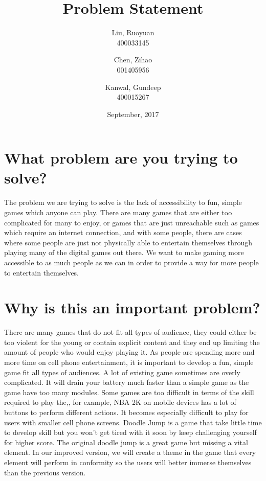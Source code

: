\documentclass[11pt, oneside]{article}
\title{Problem Statement
}
\author{Liu, Ruoyuan\\
		400033145
		\and
		Chen, Zihao\\
		001405956
		\and
		Kanwal, Gundeep\\
		400015267}
\date{September, 2017}
\begin{document}
\maketitle
\section{What problem are you trying to solve?}

\newcommand*\apos{\textsc{\char13}}
The problem we are trying to solve is the lack of accessibility to fun, simple games which anyone can play. There are many games that are either too complicated for many to enjoy, or games that are just unreachable such as games which require an internet connection, and with some people, there are cases where some people are just not physically able to entertain themselves through playing many of the digital games out there. We want to make gaming more accessible to as much people as we can in order to provide a way for more people to entertain themselves.

\section{Why is this an important problem?}

There are many games that do not fit all types of audience, they could either be too violent for the young or contain explicit content and they end up limiting the amount of people who would enjoy playing it.  As people are spending more and more time on cell phone entertainment,  it is important to develop a fun, simple game fit all types of audiences.\newline\newline
A lot of existing game sometimes are overly complicated.  It will drain your battery much faster than a simple game as the game have too many modules.  Some games are too difficult in terms of the skill required to play the,, for example, NBA 2K on mobile devices has a lot of buttons to perform different actions.  It becomes especially difficult to play for users with smaller cell phone screens.\newline\newline
Doodle Jump is a game that take little time to develop skill but you won’t get tired with it soon by keep challenging yourself for higher score.\newline\newline
The original doodle jump is a great game but missing a vital element.  In our improved version, we will create a theme in the game that every element will perform in conformity so the users will better immerse themselves than the previous version.  
\end{document}
